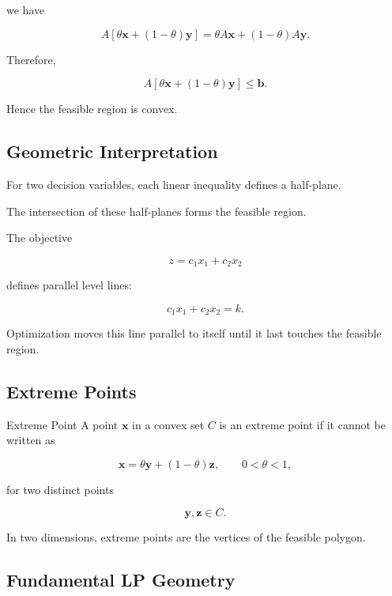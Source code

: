 we have

\[
A
[
\theta\mathbf{x}
+
(1-\theta)\mathbf{y}
]
=
\theta A\mathbf{x}
+
(1-\theta)A\mathbf{y}.
\]

Therefore,

\[
\boxed{
A
[
\theta\mathbf{x}
+
(1-\theta)\mathbf{y}
]
\leq
\mathbf{b}.
}
\]

Hence the feasible region is convex.

\subsection{Geometric Interpretation}
\label{subsec:lp-geometric-interpretation}

For two decision variables, each linear inequality defines a half-plane.

The intersection of these half-planes forms the feasible region.

The objective

\[
\boxed{
z=c_1x_1+c_2x_2
}
\]

defines parallel level lines:

\[
\boxed{
c_1x_1+c_2x_2=k.
}
\]

Optimization moves this line parallel to itself until it last touches the
feasible region.

\subsection{Extreme Points}
\label{subsec:lp-extreme-points}

\begin{definitionbox}{Extreme Point}
A point \(\mathbf{x}\) in a convex set \(C\) is an extreme point if it
cannot be written as

\[
\boxed{
\mathbf{x}
=
\theta\mathbf{y}
+
(1-\theta)\mathbf{z},
\qquad
0<\theta<1,
}
\]

for two distinct points

\[
\mathbf{y},\mathbf{z}\in C.
\]
\end{definitionbox}

In two dimensions, extreme points are the vertices of the feasible
polygon.

\subsection{Fundamental LP Geometry}
\label{subsec:fundamental-lp-geometry}

